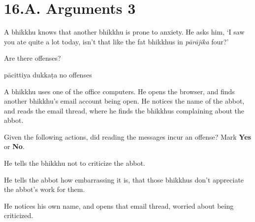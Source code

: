 \chapter{16.A. Arguments 3}
\renewcommand*{\theChapterTitle}{16.A. Arguments 3}

\begin{exam}{\autoExamName}

  \begin{problem}

    A bhikkhu knows that another bhikkhu is prone to anxiety. He asks him, `I
    saw you ate quite a lot today, isn't that like the fat bhikkhus in
    \textit{pārājika} four?'

    Are there offenses?

    \bigskip

    \begin{answers}{3}
      \bChoices
       pācittiya\eAns
       dukkaṭa\eAns
       no offenses\eAns
      \eChoices
    \end{answers}

  \end{problem}

  \problemDivide

  \begin{problem*}

    A bhikkhu uses one of the office computers. He opens the browser, and finds
    another bhikkhu's email account being open. He notices the name of the
    abbot, and reads the email thread, where he finds the bhikkhus complaining
    about the abbot.

    \bigskip

    Given the following actions, did reading the messages incur an offense? Mark \textbf{Yes} or \textbf{No}.

    \bigskip

      \begin{parts}
      \item {} He tells the bhikkhu not to criticize the abbot.

      \item {} He tells the abbot how embarrassing it is, that those
        bhikkhus don't appreciate the abbot's work for them.
        
      \item {} He notices his own name, and opens that email thread, worried
        about being criticized.
      \end{parts}

  \end{problem*}


\end{exam}
